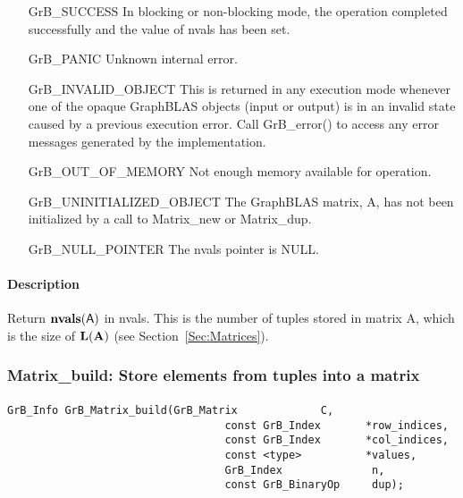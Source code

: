 \begin{itemize}[leftmargin=2.1in]
    \item[{\sf GrB\_SUCCESS}]  In blocking or non-blocking mode, the operation 
    completed successfully and the value of {\sf nvals} has been set. 

    \item[{\sf GrB\_PANIC}]    Unknown internal error.
    
    \item[{\sf GrB\_INVALID\_OBJECT}] This is returned in any execution mode 
    whenever one of the opaque GraphBLAS objects (input or output) is in an invalid 
    state caused by a previous execution error.  Call {\sf GrB\_error()} to access 
    any error messages generated by the implementation.

    \item[{\sf GrB\_OUT\_OF\_MEMORY}] Not enough memory available for operation.
    
    \item[{\sf GrB\_UNINITIALIZED\_OBJECT}]  The GraphBLAS matrix, {\sf A}, has 
    not been initialized by a call to {\sf Matrix\_new} or {\sf Matrix\_dup}.
    
    \item[{\sf GrB\_NULL\_POINTER}]  The {\sf nvals} pointer is {\sf NULL}.
\end{itemize}

\paragraph{Description}

Return $\mathbf{nvals}({\sf A})$ in {\sf nvals}.  This is the number of tuples 
stored in matrix {\sf A}, which is the size of $\mathbf{L}({\bf A})$
(see Section~\ref{Sec:Matrices}).


\subsubsection{{\sf Matrix\_build}: Store elements from tuples into a matrix}
\label{Sec:Matrix_build}

\paragraph{\syntax}

\begin{Verbatim}[samepage=true]    
        GrB_Info GrB_Matrix_build(GrB_Matrix             C,
                                  const GrB_Index       *row_indices,
                                  const GrB_Index       *col_indices, 
                                  const <type>          *values,
                                  GrB_Index              n,
                                  const GrB_BinaryOp     dup);
\end{Verbatim}

